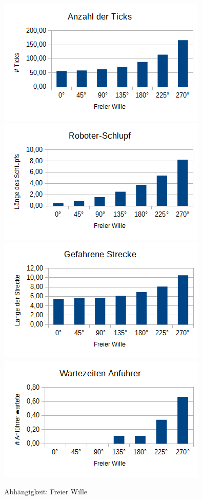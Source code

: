 \begin{figure}[h]
	\includegraphics[width=\sectionTransportPictureWidth , height=\sectionTransportPictureHeight]{graphics/Statistics/Transport/Angle_Observations.png}
	\includegraphics[width=\sectionTransportPictureWidth , height=\sectionTransportPictureHeight]{graphics/Statistics/Transport/Angle_Slack.png}
	\includegraphics[width=\sectionTransportPictureWidth , height=\sectionTransportPictureHeight]{graphics/Statistics/Transport/Angle_Way.png}
	\includegraphics[width=\sectionTransportPictureWidth , height=\sectionTransportPictureHeight]{graphics/Statistics/Transport/Angle_Move.png}
	\caption{Abhängigkeit: Freier Wille}
	\label{pic:TransportAngle}
\end{figure}

